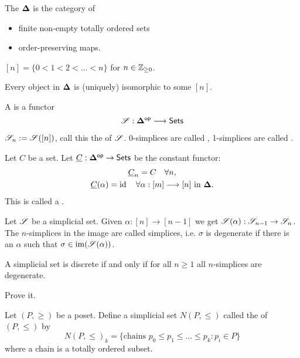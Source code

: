 \begin{definition}
	The  $\mathbf{\Delta}$ is the category of
	\begin{itemize}
		\item finite non-empty totally ordered sets
		\item order-preserving maps.
	\end{itemize}
\end{definition}
\begin{notation}
	$[n]=\{0<1<2<\dots<n\} $ for $n\in \mathbb Z_{\ge 0}$.
\end{notation}
Every object in $\mathbf{\Delta}$ is (uniquely) isomorphic to some $[n]$.
\begin{definition}
	A  is a functor
	\[
		\CS:\bb{\Delta}\op \to \Set
	\] 
\end{definition}
\begin{notation}
	$\mathscr S_n := \mathscr S([n])$, call this the  of $\mathscr S$. 0-simplices are called , 1-simplices are called .
\end{notation}
\begin{example}
	Let $C$ be a set. Let $\ul{C}:\bb{\Delta}\op\to \Set$ be the constant functor:
	\begin{gather*}
		\ul{C}_n = C\quad \forall n, \\
		\ul{C}(\alpha) = \id \quad \forall \alpha:[m]\to [n] \text{ in }\bb{\Delta}.
	\end{gather*}
	This is called a .
\end{example}
\begin{definition}
	Let $\mathscr S$ be a simplicial set. Given $\alpha:[n]\to [n-1]$ we get $\CS(\alpha):\CS_{n-1}\to \CS_n$. The $n$-simplices in the image are called  simplices, i.e. $\sigma$ is degenerate if there is an $\alpha$ such that $\sigma\in \operatorname{im}(\mathscr S(\alpha))$.
\end{definition}
\begin{lemma}
	A simplicial set is discrete if and only if for all $n\ge 1$ all $n$-simplices are degenerate.
\end{lemma}
\begin{exercise}
	Prove it.
\end{exercise}
\begin{example}
	Let $(P,\ge )$ be a poset. Define a simplicial set $N(P,\le )$ called the  of $(P,\le )$ by
	\[
		N(P,\le )_k = \{\text{chains }p_0\le p_1\le \dots\le p_k: p_i\in P\} 
	\]
	where a chain is a totally ordered subset.
\end{example}
